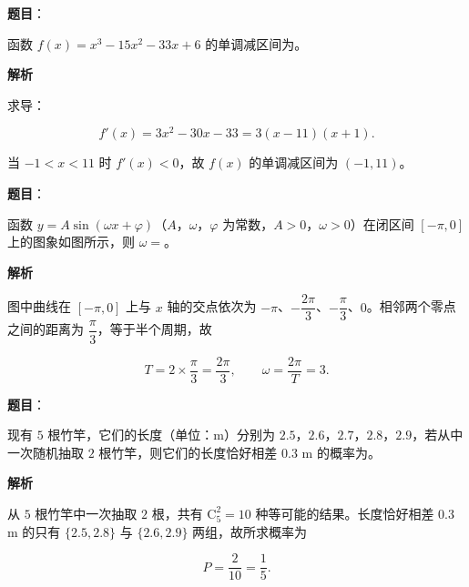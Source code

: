\begin{answer}

\textbf{题目}：

函数 $f(x)=x^3-15x^2-33x+6$ 的单调减区间为\gkblank{}。

\textbf{解析}

求导：

\nopagebreak[4]
\[f'(x)=3x^2-30x-33=3(x-11)(x+1) .\]

当 $-1<x<11$ 时 $f'(x)<0$，故 $f(x)$ 的单调减区间为 $(-1,11)$。


\end{answer}
\begin{answer}

\textbf{题目}：

函数 $y=A\sin(\omega x+\varphi)$（$A$，$\omega$，$\varphi$ 为常数，$A>0$，$\omega>0$）在闭区间 $[-\pi,0]$ 上的图象如图所示，则 $\omega=$\gkblank{}。
\nopagebreak[4]
\begin{center}\end{center}
\nopagebreak[4]
\textbf{解析}

图中曲线在 $[-\pi,0]$ 上与 $x$ 轴的交点依次为 $-\pi$、$-\dfrac{2\pi}3$、$-\dfrac{\pi}3$、$0$。相邻两个零点之间的距离为 $\dfrac{\pi}3$，等于半个周期，故

\nopagebreak[4]
\[T=2\times\frac{\pi}3=\frac{2\pi}3,\qquad \omega=\frac{2\pi}T=3 .\]


\end{answer}
\begin{answer}

\textbf{题目}：

现有 $5$ 根竹竿，它们的长度（单位：m）分别为 $2.5$，$2.6$，$2.7$，$2.8$，$2.9$，若从中一次随机抽取 $2$ 根竹竿，则它们的长度恰好相差 $0.3$ m 的概率为\gkblank{}。

\textbf{解析}

从 $5$ 根竹竿中一次抽取 $2$ 根，共有 $\mathrm C_5^2=10$ 种等可能的结果。长度恰好相差 $0.3$ m 的只有 $\{2.5,2.8\}$ 与 $\{2.6,2.9\}$ 两组，故所求概率为

\nopagebreak[4]
\[P=\frac2{10}=\frac15 .\]


\end{answer}

